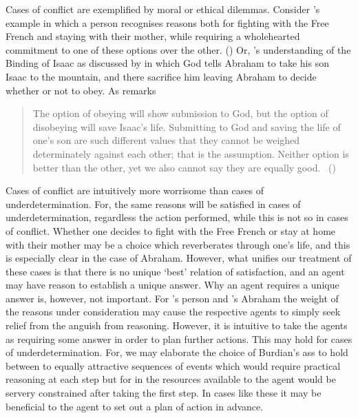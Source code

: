 \documentclass[10pt]{article}
\begin{document}
Cases of conflict are exemplified by moral or ethical dilemmas.
Consider \citeauthor{Sartre:1956aa}'s example in which a person recognises reasons both for fighting with the Free French and staying with their mother, while requiring a wholehearted commitment to one of these options over the other.
(\citeyear[166]{Bratman:2007ac})
Or, \citeauthor{Kierkegaard:2013aa}'s understanding of the Binding of Isaac as discussed by \textcite{Broome:2001aa} in which God tells Abraham to take his son Isaac to the mountain, and there sacrifice him leaving Abraham to decide whether or not to obey.
As \citeauthor{Broome:2001aa} remarks
\begin{quote}
  The option of obeying will show submission to God, but the option of disobeying will save Isaac's life.
  Submitting to God and saving the life of one’s son are such different values that they cannot be weighed determinately against each other; that is the assumption.
  Neither option is better than the other, yet we also cannot say they are equally good.\nolinebreak
  \mbox{ }\hfill(\citeyear{Broome:2001aa})
\end{quote}

Cases of conflict are intuitively more worrisome than cases of underdetermination.
For, the same reasons will be satisfied in cases of underdetermination, regardless the action performed, while this is not so in cases of conflict.
Whether one decides to fight with the Free French or stay at home with their mother may be a choice which reverberates through one's life, and this is especially clear in the case of Abraham.
However, what unifies our treatment of these cases is that there is no unique `best' relation of satisfaction, and an agent may have reason to establish a unique answer.
Why an agent requires a unique answer is, however, not important.
For \citeauthor{Sartre:1956aa}'s person and \citeauthor{Kierkegaard:2013aa}'s Abraham the weight of the reasons under consideration may cause the respective agents to simply seek relief from the anguish from reasoning.
However, it is intuitive to take the agents as requiring some answer in order to plan further actions.
This may hold for cases of underdetermination.
For, we may elaborate the choice of Burdian's ass to hold between to equally attractive sequences of events which would require practical reasoning at each step but for in the resources available to the agent would  be servery constrained after taking the first step.
In cases like these it may be beneficial to the agent to set out a plan of action in advance.
\end{document}
